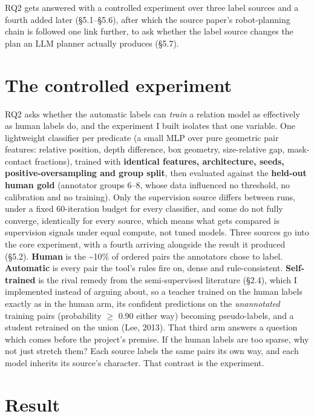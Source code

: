 
RQ2 gets answered with a controlled experiment over three label sources and a fourth added later (\S{}5.1--\S{}5.6), after which the source paper's robot-planning chain is followed one link further, to ask whether the label source changes the plan an LLM planner actually produces (\S{}5.7).

\section{The controlled experiment}

RQ2 asks whether the automatic labels can \textit{train} a relation model as effectively as human labels do, and the experiment I built isolates that one variable. One lightweight classifier per predicate (a small MLP over pure geometric pair features: relative position, depth difference, box geometry, size-relative gap, mask-contact fractions), trained with \textbf{identical features, architecture, seeds, positive-oversampling and group split}, then evaluated against the \textbf{held-out human gold} (annotator groups 6--8, whose data influenced no threshold, no calibration and no training). Only the supervision source differs between runs, under a fixed 60-iteration budget for every classifier, and some do not fully converge, identically for every source, which means what gets compared is supervision signals under equal compute, not tuned models. Three sources go into the core experiment, with a fourth arriving alongside the result it produced (\S{}5.2). \textbf{Human} is the \textasciitilde{}10\% of ordered pairs the annotators chose to label. \textbf{Automatic} is every pair the tool's rules fire on, dense and rule-consistent. \textbf{Self-trained} is the rival remedy from the semi-supervised literature (\S{}2.4), which I implemented instead of arguing about, so a teacher trained on the human labels exactly as in the human arm, its confident predictions on the \textit{unannotated} training pairs (probability $\geq$ 0.90 either way) becoming pseudo-labels, and a student retrained on the union (Lee, 2013). That third arm answers a question which comes before the project's premise. If the human labels are too sparse, why not just stretch them? Each source labels the same pairs its own way, and each model inherits its source's character. That contrast is the experiment.

\section{Result}

